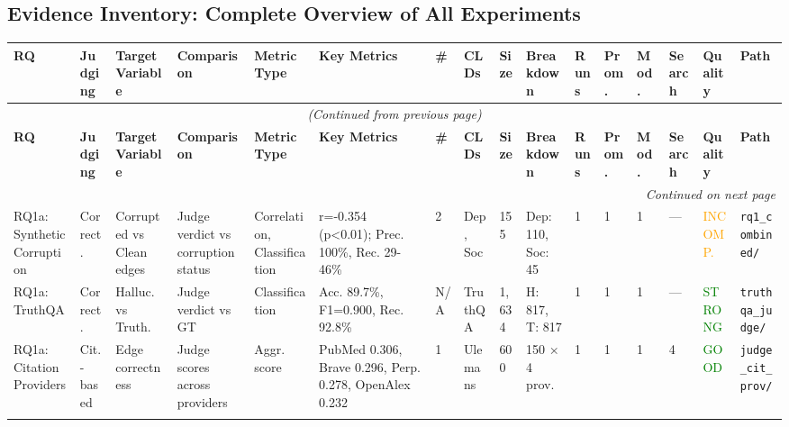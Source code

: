 \documentclass{article}
\begin{document}
\begin{landscape}

\section*{Evidence Inventory: Complete Overview of All Experiments}

{\footnotesize
\begin{longtable}{@{}p{1.8cm}p{1.2cm}p{1.5cm}p{1.8cm}p{1.2cm}p{2.8cm}p{0.5cm}p{1.5cm}p{1cm}p{2cm}p{0.6cm}p{0.6cm}p{0.8cm}p{1.5cm}p{1.2cm}p{2cm}@{}}
\toprule
\textbf{RQ} & \textbf{Judging} & \textbf{Target Variable} & \textbf{Comparison} & \textbf{Metric Type} & \textbf{Key Metrics} & \textbf{\#} & \textbf{CLDs} & \textbf{Size} & \textbf{Breakdown} & \textbf{Runs} & \textbf{Prom.} & \textbf{Mod.} & \textbf{Search} & \textbf{Quality} & \textbf{Path} \\
\midrule
\endfirsthead

\multicolumn{16}{c}{\textit{(Continued from previous page)}} \\
\toprule
\textbf{RQ} & \textbf{Judging} & \textbf{Target Variable} & \textbf{Comparison} & \textbf{Metric Type} & \textbf{Key Metrics} & \textbf{\#} & \textbf{CLDs} & \textbf{Size} & \textbf{Breakdown} & \textbf{Runs} & \textbf{Prom.} & \textbf{Mod.} & \textbf{Search} & \textbf{Quality} & \textbf{Path} \\
\midrule
\endhead

\midrule
\multicolumn{16}{r}{\textit{Continued on next page}} \\
\endfoot

\bottomrule
\endlastfoot

RQ1a: Synthetic Corruption & Correct. & Corrupted vs Clean edges & Judge verdict vs corruption status & Correlation, Classification & r=-0.354 (p<0.01); Prec. 100\%, Rec. 29-46\% & 2 & Dep, Soc & 155 & Dep: 110, Soc: 45 & 1 & 1 & 1 & --- & \textcolor{orange}{INCOMP.} & \texttt{rq1\_combined/} \\
\addlinespace

RQ1a: TruthQA & Correct. & Halluc. vs Truth. & Judge verdict vs GT & Classification & Acc. 89.7\%, F1=0.900, Rec. 92.8\% & N/A & TruthQA & 1,634 & H: 817, T: 817 & 1 & 1 & 1 & --- & \textcolor{green}{STRONG} & \texttt{truthqa\_judge/} \\
\addlinespace

RQ1a: Citation Providers & Cit.-based & Edge correctness & Judge scores across providers & Aggr. score & PubMed 0.306, Brave 0.296, Perp. 0.278, OpenAlex 0.232 & 1 & Ulemans & 600 & 150 × 4 prov. & 1 & 1 & 1 & 4 & \textcolor{green}{GOOD} & \texttt{judge\_cit\_prov/} \\
\addlinespace


\end{longtable}}
\end{landscape}
\end{document}
